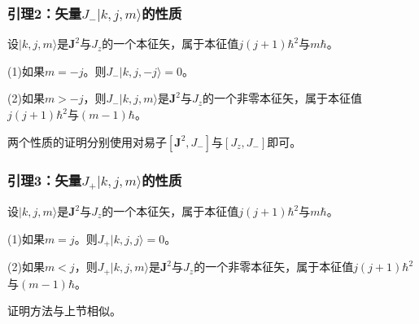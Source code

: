 \documentclass[]{article}
\begin{document}
\subsubsection{引理2：矢量$J_-|k,j,m\rangle$的性质}
设$|k,j,m\rangle$是$\boldsymbol{J}^2$与$J_z$的一个本征矢，属于本征值$j(j+1)\hbar^2$与$m\hbar$。\par 
(1)如果$m=-j$。则$J_-|k,j,-j\rangle=0$。\par 
(2)如果$m>-j$，则$J_-|k,j,m\rangle$是$\boldsymbol{J}^2$与$J_z$的一个非零本征矢，属于本征值$j(j+1)\hbar^2$与$(m-1)\hbar$。\par 
两个性质的证明分别使用对易子$[\boldsymbol{J}^2,J_-]$与$[J_z,J_-]$即可。
\subsubsection{引理3：矢量$J_+|k,j,m\rangle$的性质}
设$|k,j,m\rangle$是$\boldsymbol{J}^2$与$J_z$的一个本征矢，属于本征值$j(j+1)\hbar^2$与$m\hbar$。\par 
(1)如果$m=j$。则$J_+|k,j,j\rangle=0$。\par 
(2)如果$m<j$，则$J_+|k,j,m\rangle$是$\boldsymbol{J}^2$与$J_z$的一个非零本征矢，属于本征值$j(j+1)\hbar^2$与$(m-1)\hbar$。\par 
证明方法与上节相似。
\end{document}

